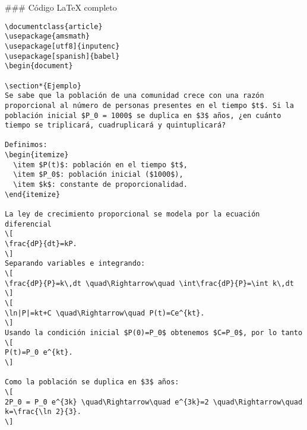 \documentclass{article}
\begin{document}
### Código LaTeX completo
\begin{verbatim}
\documentclass{article}
\usepackage{amsmath}
\usepackage[utf8]{inputenc}
\usepackage[spanish]{babel}
\begin{document}

\section*{Ejemplo}
Se sabe que la población de una comunidad crece con una razón proporcional al número de personas presentes en el tiempo $t$. Si la población inicial $P_0 = 1000$ se duplica en $3$ años, ¿en cuánto tiempo se triplicará, cuadruplicará y quintuplicará?

Definimos:
\begin{itemize}
  \item $P(t)$: población en el tiempo $t$,
  \item $P_0$: población inicial ($1000$),
  \item $k$: constante de proporcionalidad.
\end{itemize}

La ley de crecimiento proporcional se modela por la ecuación diferencial
\[
\frac{dP}{dt}=kP.
\]
Separando variables e integrando:
\[
\frac{dP}{P}=k\,dt \quad\Rightarrow\quad \int\frac{dP}{P}=\int k\,dt
\]
\[
\ln|P|=kt+C \quad\Rightarrow\quad P(t)=Ce^{kt}.
\]
Usando la condición inicial $P(0)=P_0$ obtenemos $C=P_0$, por lo tanto
\[
P(t)=P_0 e^{kt}.
\]

Como la población se duplica en $3$ años:
\[
2P_0 = P_0 e^{3k} \quad\Rightarrow\quad e^{3k}=2 \quad\Rightarrow\quad k=\frac{\ln 2}{3}.
\]
\end{verbatim}
\end{document}
